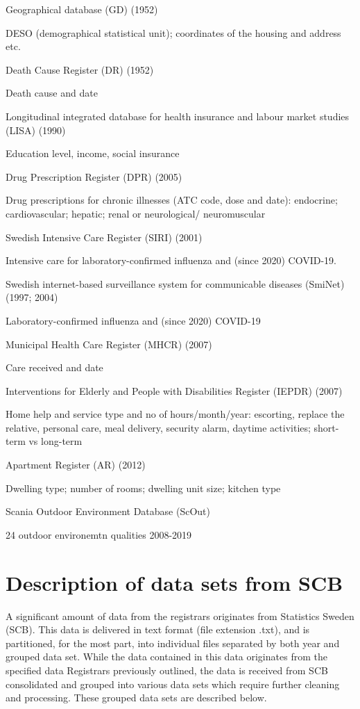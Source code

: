 \documentclass[
]{book}
\begin{document}
Geographical database (GD) (1952)

DESO (demographical statistical unit); coordinates of the housing and address etc.

Death Cause Register (DR) (1952)

Death cause and date

Longitudinal integrated database for health
insurance and labour market studies (LISA) (1990)

Education level, income, social insurance

Drug Prescription Register (DPR) (2005)

Drug prescriptions for chronic illnesses (ATC code, dose and date): endocrine; cardiovascular; hepatic; renal or neurological/ neuromuscular

Swedish Intensive Care Register (SIRI) (2001)

Intensive care for laboratory-confirmed influenza and (since 2020) COVID-19.

Swedish internet-based surveillance system for communicable diseases (SmiNet) (1997; 2004)

Laboratory-confirmed influenza and (since 2020) COVID-19

Municipal Health Care Register (MHCR) (2007)

Care received and date

Interventions for Elderly and People with Disabilities Register (IEPDR) (2007)

Home help and service type and no of hours/month/year: escorting, replace the relative, personal care, meal delivery, security alarm, daytime activities; short-term vs long-term

Apartment Register (AR) (2012)

Dwelling type; number of rooms; dwelling unit size; kitchen type

Scania Outdoor Environment Database (ScOut)

24 outdoor environemtn qualities 2008-2019

\hypertarget{description-of-data-sets-from-scb}{%
\chapter{Description of data sets from SCB}\label{description-of-data-sets-from-scb}}

A significant amount of data from the registrars originates from Statistics Sweden (SCB). This data is delivered in text format (file extension .txt), and is partitioned, for the most part, into individual files separated by both year and grouped data set. While the data contained in this data originates from the specified data Registrars previously outlined, the data is received from SCB consolidated and grouped into various data sets which require further cleaning and processing. These grouped data sets are described below.
\end{document}
